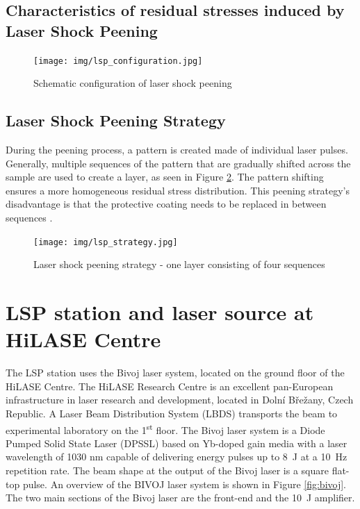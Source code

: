 \subsection{Characteristics of residual stresses induced by Laser Shock Peening}



\begin{figure}[h]
    \centering
    \texttt{[image: img/lsp\_configuration.jpg]}
    \caption{Schematic configuration of laser shock peening}
    \label{fig:lspconfiguration}
\end{figure}

\subsection{Laser Shock Peening Strategy}
During the peening process, a pattern is created made of individual laser pulses. Generally, multiple sequences of the pattern that are gradually shifted across the sample are used to create a layer, as seen in Figure \ref{fig:lspstrategy}. The pattern shifting ensures a more homogeneous residual stress distribution. This peening strategy's disadvantage is that the protective coating needs to be replaced in between sequences \cite{kaufman}.

\begin{figure}[h]
    \centering
    \texttt{[image: img/lsp\_strategy.jpg]}
    \caption{Laser shock peening strategy - one layer consisting of four sequences}
    \label{fig:lspstrategy}
\end{figure}

\section{LSP station and laser source at HiLASE Centre}

The LSP station uses the Bivoj laser system, located on the ground floor of the HiLASE Centre. The HiLASE Research Centre is an excellent pan-European infrastructure in laser research and development, located in Dolní Břežany, Czech Republic. A Laser Beam Distribution System (LBDS) transports the beam to
experimental laboratory on the 1\textsuperscript{st} floor. The Bivoj laser system is a Diode Pumped Solid State Laser (DPSSL) based on Yb-doped gain media with a laser wavelength of 1030 nm capable of delivering energy pulses up to \SI{8}{\joule} at a \SI{10}{\hertz} repetition rate. The beam shape at the output of the Bivoj laser is a square flat-top pulse. An overview of the BIVOJ laser system is shown in Figure \ref{fig:bivoj}. The two main sections of the Bivoj laser are the front-end and the \SI{10}{\joule} amplifier.

